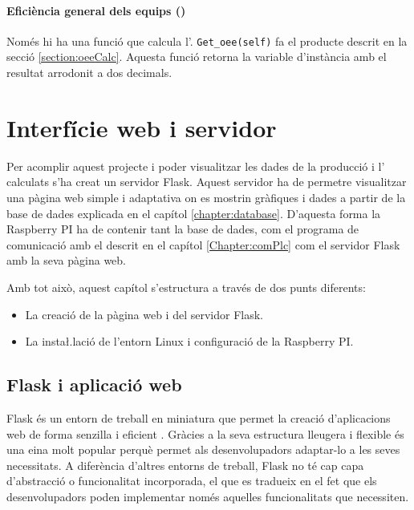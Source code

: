 \documentclass{tfgitic}[2022/06/30]
\begin{document}
\subsubsection{Eficiència general dels equips ()}
Només hi ha una funció que calcula l'. \texttt{Get\_oee(self)} fa el producte descrit en la secció \ref{section:oeeCalc}. Aquesta funció retorna la variable d'instància  amb el resultat arrodonit a dos decimals.





\chapter{Interfície web i servidor}
\label{chapter:iuServer}
Per acomplir aquest projecte i poder visualitzar les dades de la producció i l' calculats s'ha creat un servidor Flask. Aquest servidor ha de permetre visualitzar una pàgina web simple i adaptativa on es mostrin gràfiques i dades a partir de la base de dades explicada en el capítol \ref{chapter:database}. D'aquesta forma la Raspberry PI ha de contenir tant la base de dades, com el programa de comunicació amb el  descrit en el capítol \ref{Chapter:comPlc} com el servidor Flask amb la seva pàgina web.

Amb tot això, aquest capítol s'estructura a través de dos punts diferents:

\begin{itemize}
    \item La creació de la pàgina web i del servidor Flask.
    \item La insta\l.lació de l'entorn Linux i configuració de la Raspberry PI.
\end{itemize}

\section{Flask i aplicació web}
\label{section:webFlask}
Flask és un entorn de treball en miniatura que permet la creació d'aplicacions web de forma senzilla i eficient \cite{flask:flask}. Gràcies a la seva estructura lleugera i flexible és una eina molt popular perquè permet als desenvolupadors adaptar-lo a les seves necessitats. A diferència d'altres entorns de treball, Flask no té cap capa d'abstracció o funcionalitat incorporada, el que es tradueix en el fet que els desenvolupadors poden implementar només aquelles funcionalitats que necessiten.
\end{document}
